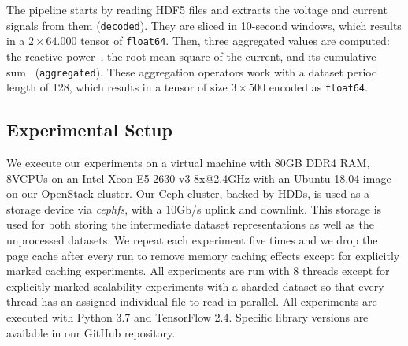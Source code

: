 The pipeline starts by reading HDF5 files and extracts the voltage and current signals from them {\color{diff}(\texttt{decoded})}. They are sliced in 10-second windows, which results in a $2\times64.000$ tensor of \texttt{float64}.
Then, three aggregated values are computed: the reactive power~\cite{barsim2014unsupervised}, the root-mean-square of the current, and its cumulative sum~\cite{jorde2019meed, trung2014event, zhu2018novel} ({\color{diff}\texttt{aggregated}}). 
These aggregation operators work with a dataset period length of 128, which results in a tensor of size $3\times500$ encoded as \texttt{float64}.

\subsection{Experimental Setup}
\label{ssec:experimental-setup}

We execute our experiments on a virtual machine with {\color{diff}80\:GB} DDR4 RAM, 8\:VCPUs on an Intel Xeon E5-2630 v3 8x@2.4\:GHz with an Ubuntu 18.04 image on our OpenStack cluster.
Our Ceph cluster, {\color{diff}backed by HDDs}, is used as a storage device via \textit{cephfs}, with a $10$\:Gb/s uplink and downlink.
This storage is used for both storing the intermediate dataset representations as well as the unprocessed datasets.
We repeat each experiment five times and we drop the page cache after every run to remove memory caching effects {\color{diff}except for explicitly marked caching experiments.
All experiments are run with 8 threads except for explicitly marked scalability experiments with a sharded dataset so that every thread has an assigned individual file to read in parallel.}
All experiments are executed with Python 3.7 and TensorFlow 2.4.
Specific library versions are available in our GitHub repository.